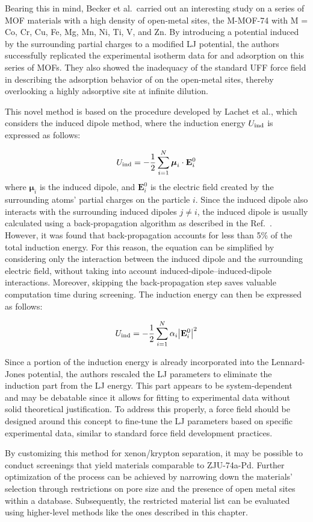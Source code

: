 \documentclass[main]{subfiles}
\begin{document}
Bearing this in mind, Becker et al.\ carried out an interesting study on a series of MOF materials with a high density of open-metal sites, the M-MOF-74 with M = Co, Cr, Cu, Fe, Mg, Mn, Ni, Ti, V, and Zn.\autocite{Becker_2017} By introducing a potential induced by the surrounding partial charges to a modified LJ potential, the authors successfully replicated the experimental isotherm data for  and  adsorption on this series of MOFs. They also showed the inadequacy of the standard UFF force field in describing the adsorption behavior of  on the open-metal sites, thereby overlooking a highly adsorptive site at infinite dilution.

This novel method is based on the procedure developed by Lachet et al.\autocite{Lachet_1998}, which considers the induced dipole method, where the induction energy $U_{\text{ind}}$ is expressed as follows:

\begin{equation}
  U_{\text{ind}} = -\frac{1}{2} \sum_{i=1}^{N} \boldsymbol{\mu}_i \cdot \mathbf{E}_i^0
\end{equation}
where $\boldsymbol{\mu}_i$ is the induced dipole, and $\mathbf{E}_i^0$ is the electric field created by the surrounding atoms' partial charges on the particle $i$. Since the induced dipole also interacts with the surrounding induced dipoles $j$$\neq$$i$, the induced dipole is usually calculated using a back-propagation algorithm as described in the Ref.~\cite{Lachet_1998}. However, it was found that back-propagation accounts for less than {5\%} of the total induction energy. For this reason, the equation can be simplified by considering only the interaction between the induced dipole and the surrounding electric field, without taking into account induced-dipole--induced-dipole interactions. Moreover, skipping the back-propagation step saves valuable computation time during screening. The induction energy can then be expressed as follows:

\begin{equation}
  U_{\text{ind}} = -\frac{1}{2} \sum_{i=1}^{N} \alpha_i {\left\lvert\mathbf{E}_i^0\right\rvert}^2
\end{equation}

Since a portion of the induction energy is already incorporated into the Lennard-Jones potential, the authors rescaled the LJ parameters to eliminate the induction part from the LJ energy. This part appears to be system-dependent and may be debatable since it allows for fitting to experimental data without solid theoretical justification. To address this properly, a force field should be designed around this concept to fine-tune the LJ parameters based on specific experimental data, similar to standard force field development practices.

By customizing this method for xenon/krypton separation, it may be possible to conduct screenings that yield materials comparable to ZJU-74a-Pd. Further optimization of the process can be achieved by narrowing down the materials' selection through restrictions on pore size and the presence of open metal sites within a database. Subsequently, the restricted material list can be evaluated using higher-level methods like the ones described in this chapter.


\OnlyInSubfile{\printglobalbibliography}
\end{document}
